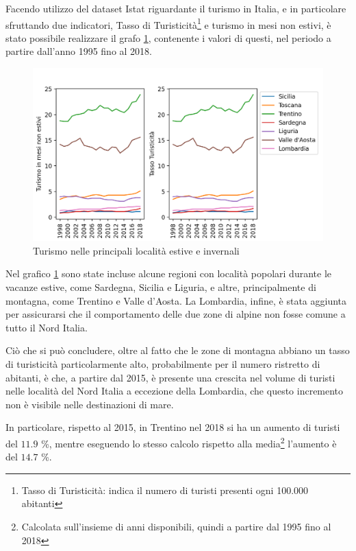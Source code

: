 \documentclass[a4paper,12pt]{report}
\begin{document}
Facendo utilizzo del dataset Istat riguardante il turismo in Italia, e in 
particolare sfruttando due indicatori, Tasso di 
Turisticità\footnote{Tasso di Turisticità: indica il numero di turisti 
presenti ogni 100.000 abitanti\cite{ONTIT:1}} 
e turismo in mesi non estivi, è stato possibile realizzare il grafo \ref{fig:turismo}, 
contenente i valori di questi, nel periodo a partire dall'anno 1995 fino al 2018. 

\begin{figure}
    \includegraphics[width=\linewidth]{../src/turismo/turismo.png}
    \caption{Turismo nelle principali località estive e invernali}
    \label{fig:turismo}
\end{figure}

Nel grafico \ref{fig:turismo} sono state incluse alcune regioni con località popolari 
durante le vacanze estive, come Sardegna, Sicilia e Liguria, e altre, principalmente 
di montagna, come Trentino e Valle d'Aosta. 
La Lombardia, infine, è stata aggiunta per assicurarsi che il comportamento delle due zone 
di alpine non fosse comune a tutto il Nord Italia. 

Ciò che si può concludere, oltre al fatto che le zone di montagna abbiano 
un tasso di turisticità particolarmente alto, probabilmente per il numero 
ristretto di abitanti, 
è che, a partire dal 2015, è presente una crescita nel volume di turisti nelle località 
del Nord Italia a eccezione della Lombardia, che questo incremento non è visibile nelle 
destinazioni di mare. 

In particolare, rispetto al 2015, in Trentino nel 2018 si ha un aumento 
di turisti del $11.9$ \%, mentre eseguendo lo stesso calcolo rispetto alla 
media\footnote{Calcolata sull'insieme di anni disponibili, quindi 
a partire dal 1995 fino al 2018} l'aumento è del $14.7$ \%. 
\end{document}
